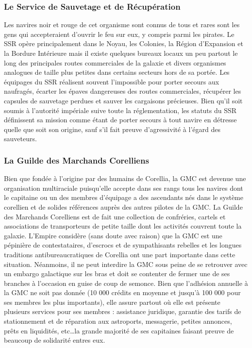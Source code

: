 \documentclass[twoside]{article}
\begin{document}
\subsubsection{Le Service de Sauvetage et de Récupération}
Les navires noir et rouge de cet organisme sont connus de tous et rares sont les gens qui accepteraient d'ouvrir le feu sur eux, y compris parmi les pirates. Le SSR opère principalement dans le Noyau, les Colonies, la Région d'Expansion et la Bordure Intérieure mais il existe quelques bureaux locaux un peu partout le long des principales routes commerciales de la galaxie et divers organismes analogues de taille plus petites dans certains secteurs hors de sa portée. Les équipages du SSR réalisent souvent l'impossible pour porter secours aux naufragés, écarter les épaves dangereuses des routes commerciales, récupérer les capsules de sauvetage perdues et sauver les cargaisons précieuses. Bien qu'il soit soumis à l'autorité impériale suive toute la réglementation, les statuts du SSR définissent sa mission comme étant de porter secours à tout navire en détresse quelle que soit son origine, sauf s'il fait preuve d'agressivité à l'égard des sauveteurs.

\subsubsection{La Guilde des Marchands Corelliens}
Bien que fondée à l'origine par des humains de Corellia, la GMC est devenue une organisation multiraciale puisqu'elle accepte dans ses rangs tous les navires dont le capitaine ou un des membres d'équipage a des ascendants nés dans le système corellien et de solides références auprès des autres pilotes de la GMC. La Guilde des Marchands Corelliens est de fait une collection de confréries, cartels et associations de transporteurs de petite taille dont les activités couvrent toute la galaxie. L'Empire considère (sans doute avec raison) que la GMC est une pépinière de contestataires, d'escrocs et de sympathisants rebelles et les longues traditions antibureaucratiques de Corellia ont une part importante dans cette situation. Néanmoins, il ne peut interdire la GMC sous peine de se retrouver avec un embargo galactique sur les bras et doit se contenter de fermer une de ses branches à l'occasion en guise de coup de semonce. Bien que l'adhésion annuelle à la GMC ne soit pas donnée (10 000 crédits en moyenne et jusqu'à 100 000 pour ses membres les plus importants), elle assure partout où elle est présente plusieurs services pour ses membres : assistance juridique, garantie des tarifs de stationnement et de réparation aux astroports, messagerie, petites annonces, prêts en liquidités, etc\ldots la grande majorité de ses capitaines faisant preuve de beaucoup de solidarité entres eux.\\
\end{document}
